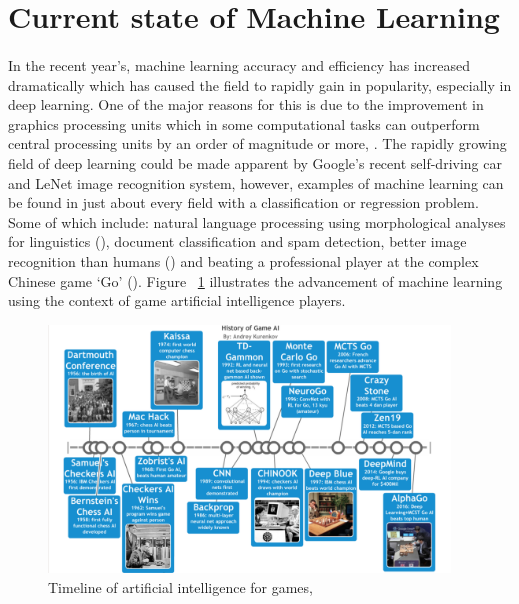 \section{Current state of Machine Learning}
\label{sec:section2}


\paragraph{}In the recent year’s, machine learning accuracy and efficiency has increased dramatically which has caused the field to rapidly gain in popularity, especially in deep learning. One of the major reasons for this is due to the improvement in graphics processing units which in some computational tasks can outperform central processing units by an order of magnitude or more, \cite{CNNperf}. The rapidly growing field of deep learning could be made apparent by Google’s recent self-driving car and LeNet image recognition system, however, examples of machine learning can be found in just about every field with a classification or regression problem. Some of which include: natural language processing using morphological analyses for linguistics (\cite{NLP}), document classification and spam detection, better image recognition than humans (\cite{manualclassifying}) and beating a professional player at the complex Chinese game ‘Go’ (\cite{Gobot}). Figure ~\ref{fig:aitimeline} illustrates the advancement of machine learning using the context of game artificial intelligence players.

\begin{figure} 
   \centering
   \includegraphics[width=0.95\textwidth]{Figures/aitimeline.png}
   \caption[Timeline of artificial intelligence for games]{ Timeline of artificial intelligence for games, ~\cite{timeline}}
   \label{fig:aitimeline}
\end{figure}


